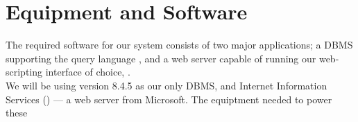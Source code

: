 \section{Equipment and Software}
\label{sec:equipmentsoftware}

The required software for our system consists of two major applications; a DBMS supporting the query language \sql[], and a web server capable of running our web-scripting interface of choice, \aspnet[].\\

We will be using \posgresql[] version 8.4.5 as our only DBMS, and  Internet Information Services (\iis[]) --- a web server from Microsoft.
The equiptment needed to power these 